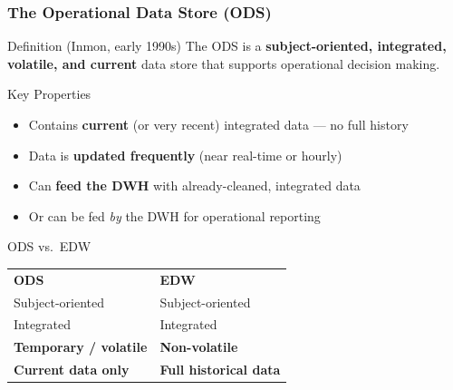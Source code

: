 \begin{frame}
  \frametitle{The Operational Data Store (ODS)}

  \begin{block}{Definition (Inmon, early 1990s)}
    The ODS is a \textbf{subject-oriented, integrated, volatile, and current}
    data store that supports operational decision making.
  \end{block}

  \begin{block}{Key Properties}
    \begin{itemize}
      \item Contains \textbf{current} (or very recent) integrated data --- no full history
      \item Data is \textbf{updated frequently} (near real-time or hourly)
      \item Can \textbf{feed the DWH} with already-cleaned, integrated data
      \item Or can be fed \textit{by} the DWH for operational reporting
    \end{itemize}
  \end{block}

  \begin{block}{ODS vs.\ EDW}
    \begin{tabularx}{\linewidth}{@{}X X@{}}
      \textbf{ODS}                    & \textbf{EDW} \\
      Subject-oriented                & Subject-oriented \\
      Integrated                      & Integrated \\
      \textbf{Temporary / volatile}   & \textbf{Non-volatile} \\
      \textbf{Current data only}      & \textbf{Full historical data} \\
    \end{tabularx}
  \end{block}
\end{frame}


